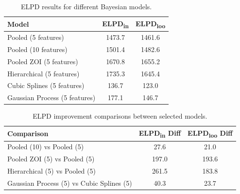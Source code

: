 \documentclass[12pt]{article}
\begin{document}
\begin{table}[H]
    \centering
    \begin{tabular}{lcc}
        \hline
        \textbf{Model} & \textbf{ELPD\textsubscript{in}} & \textbf{ELPD\textsubscript{loo}} \\
        \hline
        Pooled (5 features) & 1473.7 & 1461.6 \\
        Pooled (10 features) & 1501.4 & 1482.6 \\
        Pooled ZOI (5 features) & 1670.8 & 1655.2 \\
        Hierarchical (5 features) & 1735.3 & 1645.4 \\
        Cubic Splines (5 features) & 136.7 & 123.0 \\
        Gaussian Process (5 features) & 177.1 & 146.7 \\
        \hline
    \end{tabular}
    \caption{ELPD results for different Bayesian models.}
    \label{tab:elpd_results}
\end{table}

\begin{table}[H]
    \centering
    \begin{tabular}{lcc}
        \hline
        \textbf{Comparison} & \textbf{ELPD\textsubscript{in} Diff} & \textbf{ELPD\textsubscript{loo} Diff} \\
        \hline
        Pooled (10) vs Pooled (5) & 27.6 & 21.0 \\
        Pooled ZOI (5) vs Pooled (5) & 197.0 & 193.6 \\
        Hierarchical (5) vs Pooled (5) & 261.5 & 183.8 \\
        Gaussian Process (5) vs Cubic Splines (5) & 40.3 & 23.7 \\
        \hline
    \end{tabular}
    \caption{ELPD improvement comparisons between selected models.}
    \label{tab:elpd_improvements}
\end{table}
\end{document}
